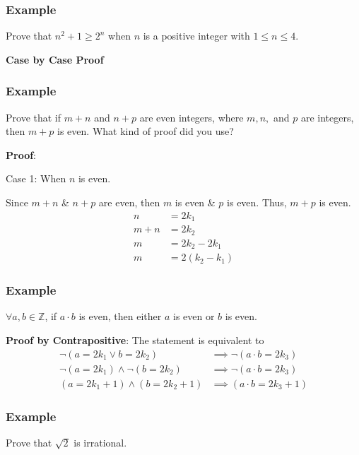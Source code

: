 \documentclass{article}
\begin{document}
\subsubsection{Example}

Prove that $ n^2 + 1 \geq 2^n $ when $ n $ is a positive integer with $ 1 \leq n \leq 4 $.

\textbf{Case by Case Proof}

\subsubsection{Example}

Prove that if $ m + n $ and $ n + p $ are even integers, where $ m, n, $ and $ p $ are integers, then $ m + p $ is even. What kind of proof did you use?

\textbf{Proof}:

Case 1: When $ n $ is even.

Since $ m + n $ \& $ n + p $ are even, then $ m $ is even \& $ p $ is even. Thus, $ m + p $ is even.
\begin{align*}
	n & = 2k_1 \\
	m + n & = 2k_2 \\
	m & = 2k_2 - 2k_1 \\
	m & = 2(k_2 - k_1)
\end{align*}

\subsubsection{Example}

$ \forall a, b \in \mathbb{Z} $, if $ a \cdot b $ is even, then either $ a $ is even or $ b $ is even.

\textbf{Proof by Contrapositive}: The statement is equivalent to
\begin{align*}
	\neg ( a = 2k_1 \lor b = 2k_2 ) & \implies \neg ( a \cdot b = 2k_3 ) \\
	\neg ( a = 2k_1 ) \land \neg ( b = 2k_2 ) & \implies \neg ( a \cdot b = 2k_3 ) \\
	( a = 2k_1 + 1 ) \land ( b = 2k_2 + 1 ) & \implies ( a \cdot b = 2k_3 + 1 )
\end{align*}

\subsubsection{Example}

Prove that $ \sqrt{2} $ is irrational.
\end{document}
